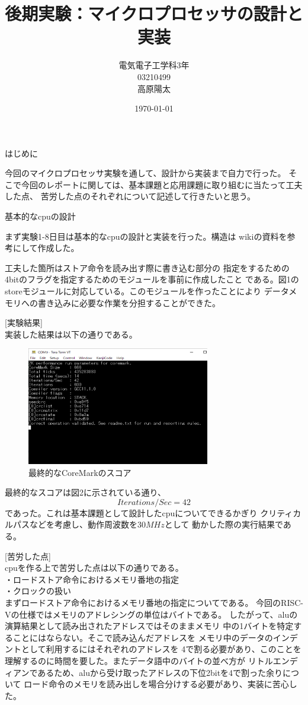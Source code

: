 \documentclass[12pt]{jreport}
\title{後期実験：マイクロプロセッサの設計と実装}
\author{電気電子工学科3年\\03210499\\高原陽太}
\date{\today}
\begin{document}
  \maketitle
  はじめに

  今回のマイクロプロセッサ実験を通して、設計から実装まで自力で行った。
  そこで今回のレポートに関しては、基本課題と応用課題に取り組むに当たって工夫した点、
  苦労した点のそれぞれについて記述して行きたいと思う。
  
  基本的なcpuの設計

  まず実験1-8日目は基本的なcpuの設計と実装を行った。構造は
  wikiの資料を参考にして作成した。
  
  工夫した箇所はストア命令を読み出す際に書き込む部分の
  指定をするための4bitのフラグを指定するためのモジュールを事前に作成したこと
  である。図1のstoreモジュールに対応している。このモジュールを作ったことにより
  データメモリへの書き込みに必要な作業を分担することができた。


  [実験結果]\\
  実装した結果は以下の通りである。
  \begin{figure}
    \centering
    \includegraphics[width=8cm]{picture/score.png}
    \caption{最終的なCoreMarkのスコア}
  \end{figure}

  最終的なスコアは図2に示されている通り、
  \begin{equation}Iterations/Sec=42\end{equation}
  であった。これは基本課題として設計したcpuについてできるかぎり
  クリティカルパスなどを考慮し、動作周波数を$30MHz$として
  動かした際の実行結果である。

  [苦労した点]\\
  cpuを作る上で苦労した点は以下の通りである。\\
  ・ロードストア命令におけるメモリ番地の指定\\
  ・クロックの扱い\\ 
  
  まずロードストア命令におけるメモリ番地の指定についてである。
  今回のRISC-Vの仕様ではメモリのアドレシングの単位はバイトである。
  したがって、aluの演算結果として読み出されたアドレスではそのままメモリ
  中の1バイトを特定することにはならない。そこで読み込んだアドレスを
  メモリ中のデータのインデントとして利用するにはそれぞれのアドレスを
  4で割る必要があり、このことを理解するのに時間を要した。またデータ語中のバイトの並べ方が
  リトルエンディアンであるため、aluから受け取ったアドレスの下位2bitを4で割った余りについて
  ロード命令のメモリを読み出しを場合分けする必要があり、実装に苦心した。
\end{document}
